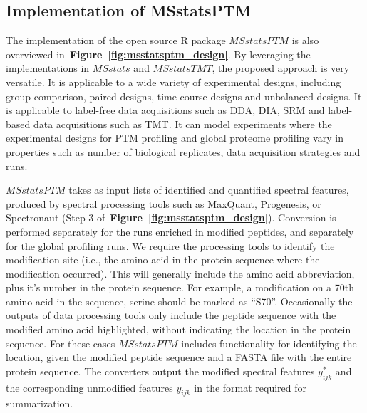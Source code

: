 \documentclass[mcp]{article}
\numberwithin{table}{section}
\def\figref#1{{\bf Figure~\ref{fig:#1}}}
\begin{document}
\subsection*{Implementation of MSstatsPTM}

The implementation of the open source R package $MSstatsPTM$ is also overviewed in~\figref{msstatsptm_design}. By leveraging the implementations in $MSstats$ and $MSstatsTMT$, the proposed approach is very versatile. It is applicable to a wide variety of experimental designs, including group comparison, paired designs, time course designs and unbalanced designs. It is applicable to label-free data acquisitions such as DDA, DIA, SRM and label-based data acquisitions such as TMT. It can model experiments where the experimental designs for PTM profiling and global proteome profiling vary in properties such as number of biological replicates, data acquisition strategies and runs. 

$MSstatsPTM$ takes as input lists of identified and quantified spectral features, produced by spectral processing tools such as MaxQuant, Progenesis, or Spectronaut (Step 3 of~\figref{msstatsptm_design}). Conversion is performed separately for the runs enriched in modified peptides, and separately for the global profiling runs. We require the processing tools to identify the modification site (i.e., the amino acid in the protein sequence where the modification occurred). This will generally include the amino acid abbreviation, plus it's number in the protein sequence. For example, a modification on a 70th amino acid in the sequence, serine should be marked as ``S70''. Occasionally the outputs of data processing tools only include the peptide sequence with the modified amino acid highlighted, without indicating the location in the protein sequence. For these cases $MSstatsPTM$ includes functionality for identifying the location, given the modified peptide sequence and a FASTA file with the entire protein sequence. The converters output the modified spectral features $y_{ijk}^{\ast}$ and the corresponding unmodified features $y_{ijk}$ in the format required for summarization.
\end{document}
